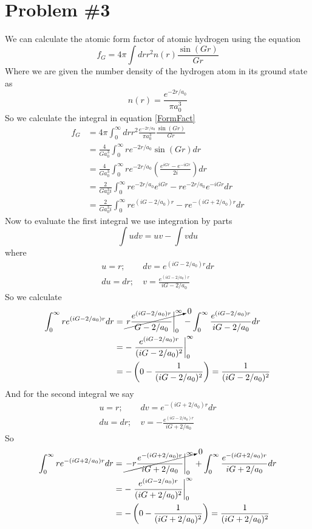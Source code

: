 \documentclass[11pt]{article}
\numberwithin{equation}{section}
\begin{document}
\section{Problem \#3}
We can calculate the atomic form factor of atomic hydrogen using the equation
\begin{equation}
f_G = 4\pi\int drr^2n(r)\frac{\sin(Gr)}{Gr}
\label{FormFact}
\end{equation}
Where we are given the number density of the hydrogen atom in its ground state as
$$n(r) = \frac{e^{-2r/a_0}}{\pi a_0^3}$$
So we calculate the integral in equation \ref{FormFact} 
\begin{align*}
f_G &= 4\pi\int_{0}^{\infty} drr^2\frac{e^{-2r/a_0}}{\pi a_0^3}\frac{\sin(Gr)}{Gr}\\
&= \frac{4}{Ga_0^3}\int_{0}^{\infty} re^{-2r/a_0}\sin(Gr)dr\\
&= \frac{4}{Ga_0^3}\int_{0}^{\infty} re^{-2r/a_0}\left(\frac{e^{iGr}-e^{-iGr}}{2i}\right)dr\\
&= \frac{2}{Ga_0^3i}\int_{0}^{\infty} re^{-2r/a_0}e^{iGr}-re^{-2r/a_0}e^{-iGr}dr\\
&= \frac{2}{Ga_0^3i}\int_{0}^{\infty} re^{(iG-2/a_0)r}-re^{-(iG+2/a_0)r}dr
\end{align*}
Now to evaluate the first integral we use integration by parts 
$$\int udv = uv - \int vdu$$
where
\begin{align*}
u = r;\  &dv = e^{(iG-2/a_0)r}dr\\
du = dr;\  &v = \frac{e^{(iG-2/a_0)r}}{iG-2/a_0} 
\end{align*}
So we calculate
\begin{align*}
\int_{0}^{\infty} re^{(iG-2/a_0)r}dr &= \cancelto{0}{\left.r\frac{e^{(iG-2/a_0)r}}{G-2/a_0}\right|_{0}^{\infty}} - \int_{0}^{\infty}\frac{e^{(iG-2/a_0)r}}{iG-2/a_0}dr\\
 &= -\left.\frac{e^{(iG-2/a_0)r}}{(iG-2/a_0)^2}\right|_{0}^{\infty}\\
 &= -\left(0 - \frac{1}{(iG-2/a_0)^2}\right) = \frac{1}{(iG-2/a_0)^2}
\end{align*}
And for the second integral we say 
\begin{align*}
u = r;\  &dv = e^{-(iG+2/a_0)r}dr\\
du = dr;\  &v = -\frac{e^{(iG-2/a_0)r}}{iG+2/a_0} 
\end{align*}
So
\begin{align*}
\int_{0}^{\infty} re^{-(iG+2/a_0)r}dr &= \cancelto{0}{\left.-r\frac{e^{-(iG+2/a_0)r}}{iG+2/a_0}\right|_{0}^{\infty}} + \int_{0}^{\infty}\frac{e^{-(iG+2/a_0)r}}{iG+2/a_0}dr\\
 &= -\left.\frac{e^{(iG-2/a_0)r}}{(iG+2/a_0)^2}\right|_{0}^{\infty}\\
 &= -\left(0 - \frac{1}{(iG+2/a_0)^2}\right) = \frac{1}{(iG+2/a_0)^2}
\end{align*}
\end{document}
